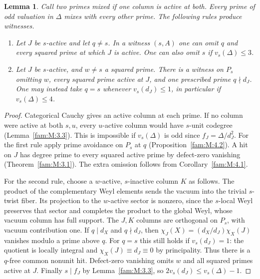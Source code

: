 \documentclass[11pt,a4paper]{article}
\numberwithin{equation}{section}
\newtheorem{lemma}[theorem]{Lemma}
\theoremstyle{remark}
\begin{document}
\begin{lemma}\label{ext:support:local}
Call two primes mixed if one column is active at both. Every prime of
odd valuation in $\Delta$ mixes with every other prime. The following
rules produce witnesses.
\begin{enumerate}
\item Let $J$ be $s$-active and let $q\ne s$. In a witness $(s,A)$
one can omit $q$ and every squared prime at which $J$ is active.
One can also omit $s$ if $v_s(\Delta)\le3$.
\item Let $J$ be $s$-active, and $w\ne s$ a squared prime. There is
a witness on $P_s$ omitting $w$, every squared prime active at $J$,
and one prescribed prime $q\nmid d_J$. One may instead take $q=s$
whenever $v_s(d_J)\le1$, in particular if $v_s(\Delta)\le4$.

\end{enumerate}
\end{lemma}
\begin{proof}
Categorical Cauchy gives an active column at each prime. If no column
were active at both $s,u$, every $u$-active column would have $s$-unit
codegree (Lemma~\ref{fam:M:3.3}). This is impossible if $v_s(\Delta)$ is
odd since $f_J=\Delta/d_J^2$. For the first rule apply prime avoidance
on $P_s$ at $q$ (Proposition~\ref{fam:M:4.2}). A hit on $J$ has degree
prime to every squared active prime by defect-zero vanishing
(Theorem~\ref{fam:M:3.1}). The extra omission follows from
Corollary~\ref{fam:M:4.1}.

For the second rule, choose a $w$-active, $s$-inactive column $K$ as
follows. The product of the
complementary Weyl elements sends the vacuum into the trivial
$s$-twist fiber. Its projection to the $w$-active sector is nonzero,
since the $s$-local Weyl preserves that sector and completes the product
to the global Weyl, whose vacuum column has full support. The $J,K$
columns are orthogonal on $P_s$, with vacuum contribution one.
If $q\mid d_X$ and $q\nmid d_J$, then
$\chi_J(X)=(d_X/d_J)\chi_X(J)$ vanishes modulo a prime above $q$.
For $q=s$ this still holds if $v_s(d_J)=1$: the quotient is locally
integral and $\chi_X(J)\equiv d_J\equiv0$ by principality.
Thus there is a $q$-free common nonunit hit. Defect-zero vanishing
omits $w$ and all squared primes active at $J$. Finally $s\mid f_J$
by Lemma~\ref{fam:M:3.3}, so $2v_s(d_J)\le v_s(\Delta)-1$.

\end{proof}
\end{document}
